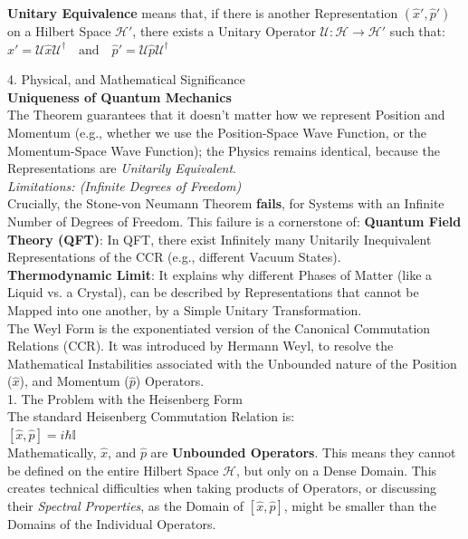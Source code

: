 \documentclass[a4paper, 10pt, onepage]{elegantbook}
\begin{document}
{  \textbf{Unitary Equivalence} means that, if there is another Representation $(\hat{x}', \hat{p}')$ on a Hilbert Space $\mathcal{H}'$, there exists a Unitary Operator $\mathcal{U} : \mathcal{H} \to \mathcal{H}'$ such that:  \\
$\hat{x}' = \mathcal{U} \hat{x} \mathcal{U}^\dagger \quad \text{and} \quad \hat{p}' = \mathcal{U} \hat{p} \mathcal{U}^\dagger$

    4. Physical, and Mathematical Significance  \\

  \textbf{Uniqueness of Quantum Mechanics}  \\

The Theorem guarantees that it doesn't matter how we represent Position and Momentum (e.g., whether we use the Position-Space Wave Function, or the Momentum-Space Wave Function); the Physics remains identical, because the Representations are \emph{Unitarily Equivalent}.  \\

     \emph{Limitations: (Infinite Degrees of Freedom)}  \\

Crucially, the Stone-von Neumann Theorem \textbf{fails}, for Systems with an Infinite Number of Degrees of Freedom. This failure is a cornerstone of:
 \textbf{Quantum Field Theory (QFT)}: In QFT, there exist Infinitely many Unitarily Inequivalent Representations of the CCR (e.g., different Vacuum States).  \\
 \textbf{Thermodynamic Limit}: It explains why different Phases of Matter (like a Liquid vs. a Crystal), can be described by Representations that cannot be Mapped into one another, by a Simple Unitary Transformation.  \\

The Weyl Form is the exponentiated version of the Canonical Commutation Relations (CCR). It was introduced by Hermann Weyl, to resolve the Mathematical Instabilities associated with the Unbounded nature of the Position ($\hat{x}$), and Momentum ($\hat{p}$) Operators.  \\

    1. The Problem with the Heisenberg Form  \\

The standard Heisenberg Commutation Relation is:  \\
$[\hat{x}, \hat{p}] = i\hbar \mathbb{I}$  \\
Mathematically, $\hat{x}$, and $\hat{p}$ are \textbf{Unbounded Operators}. This means they cannot be defined on the entire Hilbert Space $\mathcal{H}$, but only on a Dense Domain. This creates technical difficulties when taking products of Operators, or discussing their \emph{Spectral Properties}, as the Domain of $[\hat{x}, \hat{p}]$, might be smaller than the Domains of the Individual Operators.  \\

}
\end{document}
